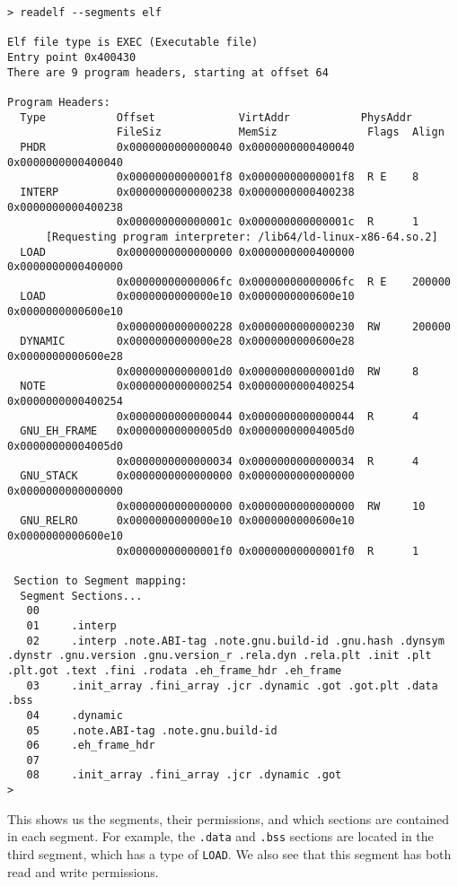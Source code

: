 \begin{lstlisting}
> readelf --segments elf

Elf file type is EXEC (Executable file)
Entry point 0x400430
There are 9 program headers, starting at offset 64

Program Headers:
  Type           Offset             VirtAddr           PhysAddr
                 FileSiz            MemSiz              Flags  Align
  PHDR           0x0000000000000040 0x0000000000400040 0x0000000000400040
                 0x00000000000001f8 0x00000000000001f8  R E    8
  INTERP         0x0000000000000238 0x0000000000400238 0x0000000000400238
                 0x000000000000001c 0x000000000000001c  R      1
      [Requesting program interpreter: /lib64/ld-linux-x86-64.so.2]
  LOAD           0x0000000000000000 0x0000000000400000 0x0000000000400000
                 0x00000000000006fc 0x00000000000006fc  R E    200000
  LOAD           0x0000000000000e10 0x0000000000600e10 0x0000000000600e10
                 0x0000000000000228 0x0000000000000230  RW     200000
  DYNAMIC        0x0000000000000e28 0x0000000000600e28 0x0000000000600e28
                 0x00000000000001d0 0x00000000000001d0  RW     8
  NOTE           0x0000000000000254 0x0000000000400254 0x0000000000400254
                 0x0000000000000044 0x0000000000000044  R      4
  GNU_EH_FRAME   0x00000000000005d0 0x00000000004005d0 0x00000000004005d0
                 0x0000000000000034 0x0000000000000034  R      4
  GNU_STACK      0x0000000000000000 0x0000000000000000 0x0000000000000000
                 0x0000000000000000 0x0000000000000000  RW     10
  GNU_RELRO      0x0000000000000e10 0x0000000000600e10 0x0000000000600e10
                 0x00000000000001f0 0x00000000000001f0  R      1

 Section to Segment mapping:
  Segment Sections...
   00     
   01     .interp 
   02     .interp .note.ABI-tag .note.gnu.build-id .gnu.hash .dynsym .dynstr .gnu.version .gnu.version_r .rela.dyn .rela.plt .init .plt .plt.got .text .fini .rodata .eh_frame_hdr .eh_frame 
   03     .init_array .fini_array .jcr .dynamic .got .got.plt .data .bss 
   04     .dynamic 
   05     .note.ABI-tag .note.gnu.build-id 
   06     .eh_frame_hdr 
   07     
   08     .init_array .fini_array .jcr .dynamic .got 
> 
\end{lstlisting}

This shows us the segments, their permissions, and which sections are contained
in each segment. For example, the \texttt{.data} and \texttt{.bss} sections are
located in the third segment, which has a type of \texttt{LOAD}. We also see
that this segment has both read and write permissions.


